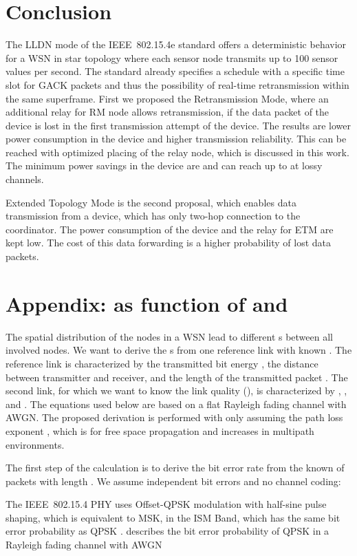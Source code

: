 \documentclass[times,10pt,twocolumn]{article}
\begin{document}
\section{Conclusion}
\label{section_conclusion}
The LLDN mode of the IEEE~802.15.4e standard offers a deterministic behavior for a WSN in star topology where each sensor node transmits up to 100 sensor values per second. The standard already specifies a schedule with a specific time slot for GACK packets and thus the possibility of real-time retransmission within the same superframe. First we proposed the Retransmission Mode, where an additional relay for RM node allows retransmission, if the data packet of the device is lost in the first transmission attempt of the device. The results are lower power consumption in the device and higher transmission reliability. This can be reached with optimized placing of the relay node, which is discussed in this work. The minimum power savings in the device are  and can reach up to  at lossy channels.

Extended Topology Mode is the second proposal, which enables data transmission from a device, which has only two-hop connection to the coordinator. The power consumption of the device and the relay for ETM are kept low. The cost of this data forwarding is a higher probability of lost data packets.

\section*{Appendix:  as function of  and }
\label{appendix_PER_of_d_and_E}

The spatial distribution of the nodes in a  WSN lead to different s between all involved nodes. We want to derive the s from one reference link with known . The reference link is characterized by the transmitted bit energy , the distance  between transmitter and receiver, and the length of the transmitted packet . The second link, for which we want to know the link quality (), is characterized by , , and . The equations used below are based on a flat Rayleigh fading channel with AWGN. The proposed derivation is performed with only assuming the path loss exponent , which is  for free space propagation and increases in multipath environments.

The first step of the calculation is to derive the bit error rate  from the known  of packets with length . We assume independent bit errors and no channel coding:

The IEEE~802.15.4 PHY uses Offset-QPSK modulation with half-sine pulse shaping, which is equivalent to MSK, in the  ISM Band, which has the same bit error probability as QPSK \cite{digital_communication_over_fading_channels}. \cite{fundamentals_wireless_comm} describes the bit error probability of QPSK in a Rayleigh fading channel with AWGN
\end{document}
